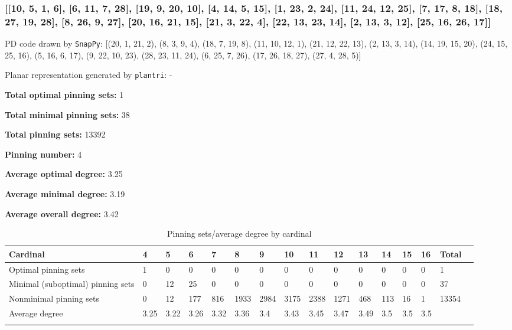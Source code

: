 \documentclass{article}%
\begin{document}
\newpage

\subsubsection{[[10, 5, 1, 6], [6, 11, 7, 28], [19, 9, 20, 10], [4, 14, 5, 15], [1, 23, 2, 24], [11, 24, 12, 25], [7, 17, 8, 18], [18, 27, 19, 28], [8, 26, 9, 27], [20, 16, 21, 15], [21, 3, 22, 4], [22, 13, 23, 14], [2, 13, 3, 12], [25, 16, 26, 17]]}

{\small\noindent PD code drawn by \texttt{SnapPy}: [(20, 1, 21, 2), (8, 3, 9, 4), (18, 7, 19, 8), (11, 10, 12, 1), (21, 12, 22, 13), (2, 13, 3, 14), (14, 19, 15, 20), (24, 15, 25, 16), (5, 16, 6, 17), (9, 22, 10, 23), (28, 23, 11, 24), (6, 25, 7, 26), (17, 26, 18, 27), (27, 4, 28, 5)]}

{\small\noindent Planar representation generated by \texttt{plantri}: -}

\begin{multicols}{2}
{\normalsize \noindent\textbf{Total optimal pinning sets:} 1

\noindent\textbf{Total minimal pinning sets:} 38

\noindent\textbf{Total pinning sets:} 13392

\noindent\textbf{Pinning number:} 4

}
\columnbreak

{\normalsize \noindent\textbf{Average optimal degree:} 3.25

\noindent\textbf{Average minimal degree:} 3.19

\noindent\textbf{Average overall degree:} 3.42

}
\end{multicols}

\begin{table}[ht]
	\caption{Pinning sets/average degree by cardinal}
	\centering
	\renewcommand{\arraystretch}{1.5}
	\begin{tabularx}{\textwidth}{lXXXXXXXXXXXXXXX}
		\toprule
			Cardinal & 4 & 5 & 6 & 7 & 8 & 9 & 10 & 11 & 12 & 13 & 14 & 15 & 16 & Total\\
			\hline
			Optimal pinning sets & 1 & 0 & 0 & 0 & 0 & 0 & 0 & 0 & 0 & 0 & 0 & 0 & 0 & 1 \\
			Minimal (suboptimal) pinning sets & 0 & 12 & 25 & 0 & 0 & 0 & 0 & 0 & 0 & 0 & 0 & 0 & 0 & 37 \\
			Nonminimal pinning sets & 0 & 12 & 177 & 816 & 1933 & 2984 & 3175 & 2388 & 1271 & 468 & 113 & 16 & 1 & 13354 \\
			Average degree & 3.25 & 3.22 & 3.26 & 3.32 & 3.36 & 3.4 & 3.43 & 3.45 & 3.47 & 3.49 & 3.5 & 3.5 & 3.5 &  \\
		\bottomrule \\ 
	\end{tabularx}
\end{table}
\end{document}
